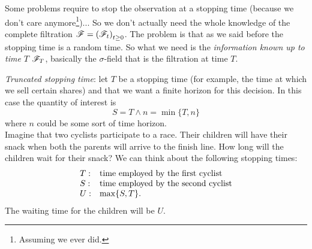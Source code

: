 \documentclass{report}
\begin{document}
Some problems require to stop the observation at a stopping time (because we don't care anymore\footnote{Assuming we ever did.})... So we don't actually need the whole knowledge of the complete filtration $\mathscr{F}={\left(\mathscr{F}_t\right)}_{t\geq 0}$. The problem is that as we said before the stopping time is a random time. So what we need is the \textit{information known up to time $T$} $\mathscr{F}_T$, basically the $\sigma$-field that is the filtration at time $T$. 
\begin{example}
	\emph{Truncated stopping time}: let $T$ be a stopping time (for example, the time at which we sell certain shares) and that we want a finite horizon for this decision. In this case the quantity of interest is
	\begin{equation*}
		S=T\wedge n=\min\{T,n\}
	\end{equation*}
	where $n$ could be some sort of time horizon.\\
	Imagine that two cyclists participate to a race. Their children will have their snack when both the parents will arrive to the finish line. How long will the children wait for their snack?
	We can think about the following stopping times:
	\[ 	\begin{array}{l l}
		T: & \text{time employed by the first cyclist}\\
		S: & \text{time employed by the second cyclist}\\
		U: &\max\{S,T\}.
		
	\end{array} \]
	The waiting time for the children will be $U$.
\end{example}
\end{document}
